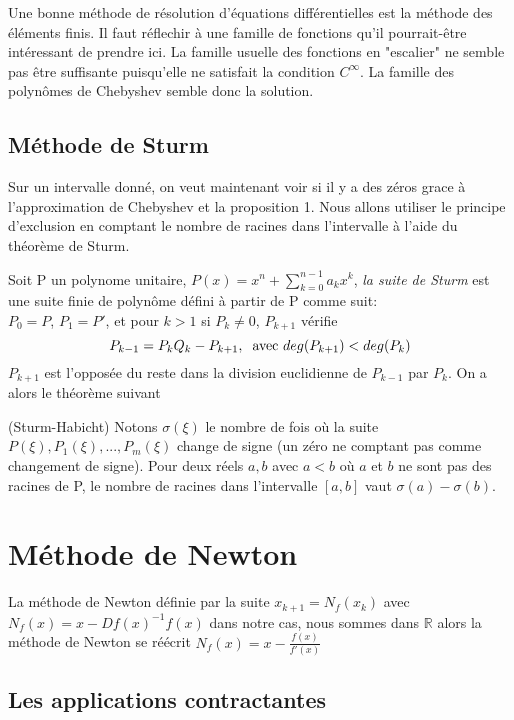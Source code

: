 \documentclass[a4paper,10.5pt]{article}
\begin{document}
	Une bonne méthode de résolution d'équations différentielles est la méthode des éléments finis. Il faut réflechir à une famille de fonctions qu'il pourrait-être intéressant de prendre ici. La famille usuelle des fonctions en "escalier" ne semble pas être suffisante puisqu'elle ne satisfait la condition $C^{\infty}$.
	La famille des polynômes de Chebyshev semble donc la solution.
	
	\subsection{Méthode de Sturm}
	
	Sur un intervalle donné, on veut maintenant voir si il y a des zéros grace à l'approximation de Chebyshev et la proposition 1. Nous allons utiliser le principe d'exclusion en comptant le nombre de racines dans l'intervalle à l'aide du théorème de Sturm. 
	
	
	Soit P un polynome unitaire, $P(x)=x^{n} + \sum^{n-1}_{k=0}a_{k}x^{k}$, \textit {la suite de Sturm} est une suite finie de polynôme défini à partir de P comme suit:\\
	$P_{0}=P$, $P_{1}=P'$, et pour $k > 1$ si $P_{k} \neq 0$,  $P_{k+1}$ vérifie
	\[P_{k-1}=P_{k}Q_{k}-P_{k+1},\hspace{2mm}\text{avec }    deg(P_{k+1})<deg(P_{k})\] 
	$P_{k+1}$ est l'opposée du reste dans la division euclidienne de $P_{k-1}$ par $P_{k}$. On a alors le théorème suivant 
	

	\begin{theorem}(Sturm-Habicht)
		Notons $\sigma(\xi)$ le nombre de fois où la suite $P(\xi),P_{1}(\xi),...,P_{m}(\xi)$ change de signe (un zéro ne comptant pas comme changement de signe).
		Pour deux réels $a,b$ avec $a<b$ où $a$ et $b$ ne sont pas des racines de P, le nombre de racines dans l'intervalle $[a,b]$ vaut
		$\sigma(a)-\sigma(b)$.
	\end{theorem}
	
	\section{Méthode de Newton}
	
	La méthode de Newton définie par la suite $x_{k+1}=N_{f}(x_{k})$ avec $N_{f}(x)=x-Df(x)^{-1}f(x)$ dans notre cas, nous sommes dans $\mathbb{R}$ alors la méthode de Newton se réécrit $N_{f}(x)=x-\frac{f(x)}{f'(x)}$ 
	
	\subsection{Les applications contractantes}
	
\end{document}
